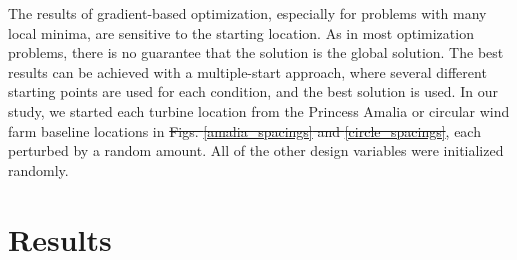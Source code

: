 \documentclass[wes, manuscript]{copernicus}
\providecommand{\DIFadd}[1]{{\protect\color{blue}\uwave{#1}}} %
\providecommand{\DIFdel}[1]{{\protect\color{red}\sout{#1}}}                      %
\providecommand{\DIFaddbegin}{} %
\providecommand{\DIFaddend}{} %
\providecommand{\DIFdelbegin}{} %
\providecommand{\DIFdelend}{} %
\begin{document}
The results of gradient-based optimization, especially for problems with many local minima, are sensitive to the starting location. As in most optimization problems, there is no guarantee that the solution is the global solution. The best results can be achieved with a multiple-start approach, where several different starting points are used for each condition, and the best solution is used. In our study, we started each turbine location from the Princess Amalia or circular wind farm baseline locations in \DIFdelbegin \DIFdel{Figs. \ref{amalia_spacings} and \ref{circle_spacings}}\DIFdelend \DIFaddbegin \DIFadd{Fig. \ref{farm_spacings}}\DIFaddend , each perturbed by a random amount. All of the other design variables were initialized randomly.








\section{Results}
\newcommand\myeq{\mkern1.5mu{=}\mkern1.5mu}
\end{document}
